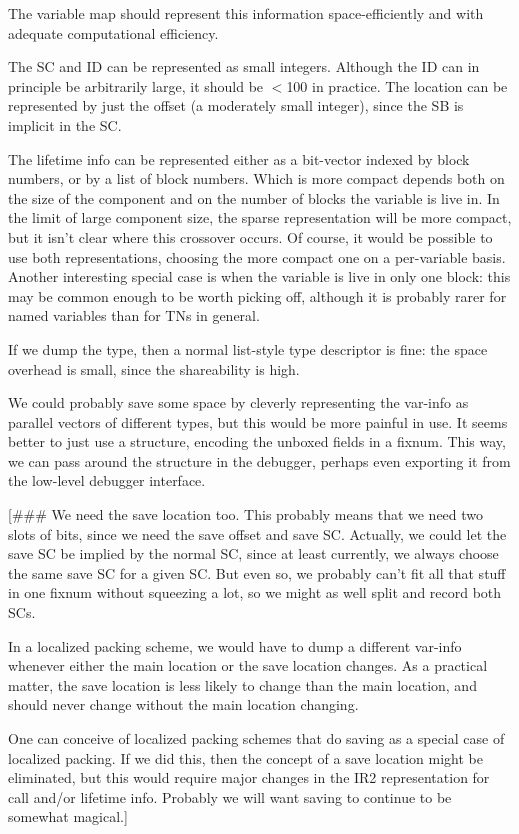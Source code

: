 The variable map should represent this information space-efficiently and with
adequate computational efficiency.

The SC and ID can be represented as small integers.  Although the ID can in
principle be arbitrarily large, it should be $<$100 in practice.  The location
can be represented by just the offset (a moderately small integer), since the
SB is implicit in the SC.

The lifetime info can be represented either as a bit-vector indexed by block
numbers, or by a list of block numbers.  Which is more compact depends both on
the size of the component and on the number of blocks the variable is live in.
In the limit of large component size, the sparse representation will be more
compact, but it isn't clear where this crossover occurs.  Of course, it would
be possible to use both representations, choosing the more compact one on a
per-variable basis.  Another interesting special case is when the variable is
live in only one block: this may be common enough to be worth picking off,
although it is probably rarer for named variables than for TNs in general.

If we dump the type, then a normal list-style type descriptor is fine: the
space overhead is small, since the shareability is high.

We could probably save some space by cleverly representing the var-info as
parallel vectors of different types, but this would be more painful in use.
It seems better to just use a structure, encoding the unboxed fields in a
fixnum.  This way, we can pass around the structure in the debugger, perhaps
even exporting it from the low-level debugger interface.

[\#\#\# We need the save location too.  This probably means that we need two slots
of bits, since we need the save offset and save SC.  Actually, we could let the
save SC be implied by the normal SC, since at least currently, we always choose
the same save SC for a given SC.  But even so, we probably can't fit all that
stuff in one fixnum without squeezing a lot, so we might as well split and
record both SCs.

In a localized packing scheme, we would have to dump a different var-info
whenever either the main location or the save location changes.  As a practical
matter, the save location is less likely to change than the main location, and
should never change without the main location changing.

One can conceive of localized packing schemes that do saving as a special case
of localized packing.  If we did this, then the concept of a save location
might be eliminated, but this would require major changes in the IR2
representation for call and/or lifetime info.  Probably we will want saving to
continue to be somewhat magical.]


